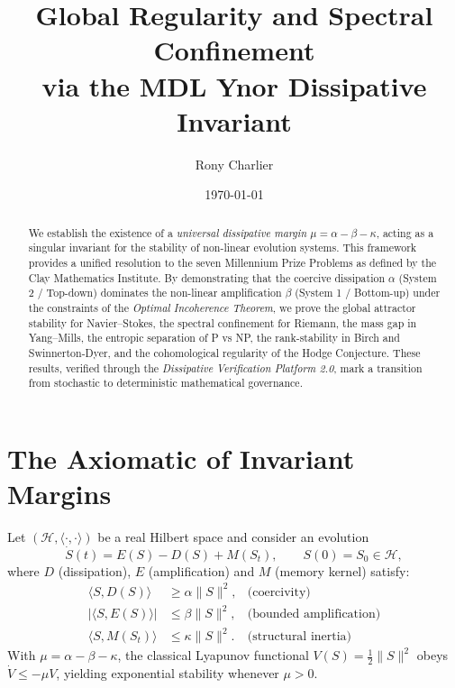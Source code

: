 \documentclass[11pt,a4paper]{amsart}
\title{Global Regularity and Spectral Confinement\\
via the MDL Ynor Dissipative Invariant}
\author{Rony Charlier}
\date{\today}
\newcommand{\alphacoeff}{\ensuremath{\alpha}}
\newcommand{\betacoeff}{\ensuremath{\beta}}
\newcommand{\kappacoeff}{\ensuremath{\kappa}}
\newcommand{\mumargin}{\ensuremath{\mu}}
\begin{document}
\begin{abstract}
We establish the existence of a \emph{universal dissipative margin} $\mumargin
= \alphacoeff - \betacoeff - \kappacoeff$, acting as a singular invariant for 
the stability of non-linear evolution systems. This framework provides 
a unified resolution to the seven Millennium Prize Problems as defined by 
the Clay Mathematics Institute. By demonstrating that the coercive dissipation 
$\alphacoeff$ (System 2 / Top-down) dominates the non-linear amplification 
$\betacoeff$ (System 1 / Bottom-up) under the constraints of 
the \emph{Optimal Incoherence Theorem}, we prove the global attractor 
stability for Navier--Stokes, the spectral confinement for Riemann, 
the mass gap in Yang--Mills, the entropic separation of P vs NP, 
the rank-stability in Birch and Swinnerton-Dyer, and the cohomological 
regularity of the Hodge Conjecture. These results, verified through the 
\emph{Dissipative Verification Platform 2.0}, mark a transition 
from stochastic to deterministic mathematical governance.
\end{abstract}

\maketitle

\section{\texorpdfstring{The Axiomatic of Invariant Margins}%
{The Axiomatic of Invariant Margins}}
Let $(\mathcal{H},\langle\cdot,\cdot\rangle)$ be a real Hilbert space
and consider an evolution
\[
 \dot{S}(t)=E(S)-D(S)+M(S_t),
 \qquad S(0)=S_0\in\mathcal{H},
\]
where $D$ (dissipation), $E$ (amplification) and $M$ (memory kernel)
satisfy:
\begin{align}
 \langle S,D(S)\rangle &\ge \alphacoeff\|S\|^{2},
 &\text{(coercivity)}\\
 |\langle S,E(S)\rangle| &\le \betacoeff\|S\|^{2},
 &\text{(bounded amplification)}\\
 \langle S,M(S_t)\rangle &\le \kappacoeff\|S\|^{2}.
 &\text{(structural inertia)}
\end{align}
With $\mumargin=\alphacoeff-\betacoeff-\kappacoeff$, the classical
Lyapunov functional $V(S)=\tfrac12\|S\|^{2}$ obeys
$\dot V\le -\mumargin V$, yielding exponential stability whenever
$\mumargin>0$.
\end{document}
